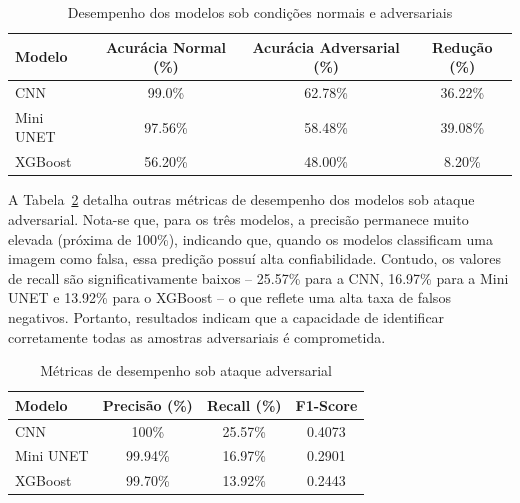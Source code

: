 \documentclass[12pt]{article}
\begin{document}
\begin{table}[htbp]
    \centering
    \caption{Desempenho dos modelos sob condições normais e adversariais}\label{tab:resultados_quantitativos}
    \begin{tabular}{lccc}
        \hline
        \textbf{Modelo} & \textbf{Acurácia Normal (\%)} & \textbf{Acurácia Adversarial (\%)} & \textbf{Redução (\%)} \\
        \hline
        CNN             & 99.0\%                        & 62.78\%                            & 36.22\%               \\
        Mini UNET       & 97.56\%                       & 58.48\%                            & 39.08\%               \\
        XGBoost         & 56.20\%                       & 48.00\%                            & 8.20\%                \\
        \hline
    \end{tabular}
\end{table}

A Tabela~\ref{tab:resultados_metricas} detalha outras métricas de desempenho
dos modelos sob ataque adversarial. Nota-se que, para os três modelos, a
precisão permanece muito elevada (próxima de 100\%), indicando que, quando os
modelos classificam uma imagem como falsa, essa predição possuí alta
confiabilidade. Contudo, os valores de recall são significativamente baixos –
25.57\% para a CNN, 16.97\% para a Mini UNET e 13.92\% para o XGBoost – o que
reflete uma alta taxa de falsos negativos. Portanto, resultados indicam que a
capacidade de identificar corretamente todas as amostras adversariais é
comprometida.

\begin{table}[htbp]
    \centering
    \caption{Métricas de desempenho sob ataque adversarial}\label{tab:resultados_metricas}
    \begin{tabular}{lccc}
        \hline
        \textbf{Modelo} & \textbf{Precisão (\%)} & \textbf{Recall (\%)} & \textbf{F1-Score} \\
        \hline
        CNN             & 100\%                  & 25.57\%              & 0.4073            \\
        Mini UNET       & 99.94\%                & 16.97\%              & 0.2901            \\
        XGBoost         & 99.70\%                & 13.92\%              & 0.2443            \\
        \hline
    \end{tabular}
\end{table}
\end{document}

